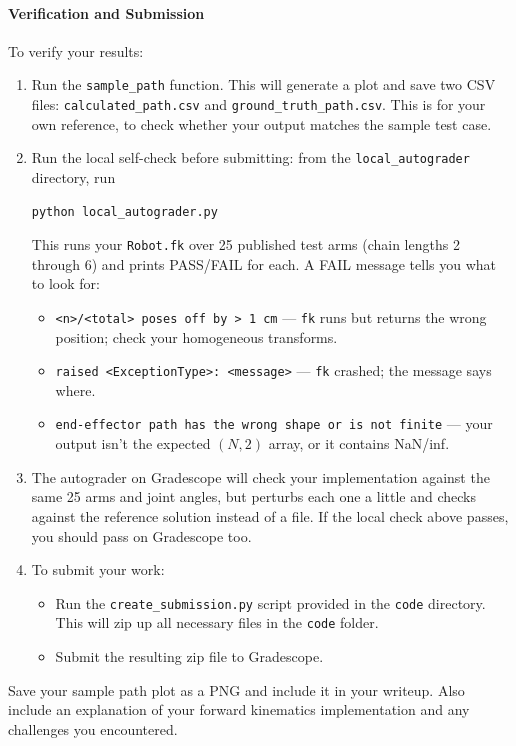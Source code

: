 \documentclass{16384_doc}
\begin{document}
\begin{questions}
    \paragraph{Verification and Submission} To verify your results:
    \begin{enumerate}
      \item Run the \verb!sample_path! function. This will generate a plot and save
            two CSV files: \verb!calculated_path.csv! and \verb!ground_truth_path.csv!.
            This is for your own reference, to check whether your output matches
            the sample test case.
      \item Run the local self-check before submitting: from the
            \verb!local_autograder! directory, run
            \begin{verbatim}
python local_autograder.py
            \end{verbatim}
            This runs your \verb!Robot.fk! over 25 published test arms (chain
            lengths 2 through 6) and prints PASS/FAIL for each. A FAIL message
            tells you what to look for:
            \begin{itemize}
              \item \verb!<n>/<total> poses off by > 1 cm! --- \verb!fk! runs
                    but returns the wrong position; check your homogeneous
                    transforms.
              \item \verb!raised <ExceptionType>: <message>! --- \verb!fk!
                    crashed; the message says where.
              \item \verb!end-effector path has the wrong shape or is not finite!
                    --- your output isn't the expected $(N, 2)$ array, or it
                    contains NaN/inf.
            \end{itemize}
      \item The autograder on Gradescope will check your implementation against
            the same 25 arms and joint angles, but perturbs each one a little
            and checks against the reference solution instead of a file. If the
            local check above passes, you should pass on Gradescope too.
      \item To submit your work:
        \begin{itemize}
          \item Run the \verb!create_submission.py! script provided in the \verb!code! directory.
                This will zip up all necessary files in the \verb!code! folder.
          \item Submit the resulting zip file to Gradescope.
        \end{itemize}
    \end{enumerate}
    Save your sample path plot as a PNG and include it in your writeup. Also include
    an explanation of your forward kinematics implementation and any challenges you
    encountered.
\end{questions}
\end{document}
